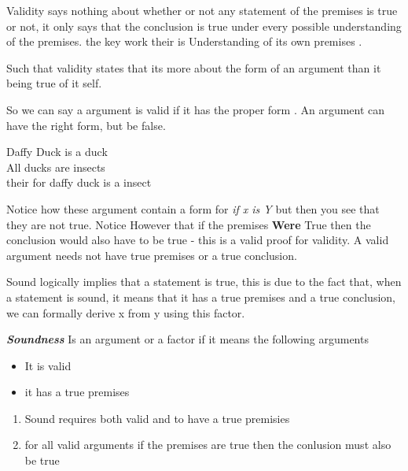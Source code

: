 \documentclass{article}
\theoremstyle{mytheoremstyle}
\theoremstyle{mytheoremstyle}
\theoremstyle{myproblemstyle}
\begin{document}
\begin{theorem}
    Validity says nothing about whether or not any statement of the premises is true or not, it only says that the conclusion is true under every possible understanding of the premises.
    the key work their is Understanding of its own premises .

    Such that validity states that its more about the form of an argument than it being true of it self.
\end{theorem}

So we can say a argument is valid if it has the proper form . An argument can have the right form, but be false.
\\
\begin{tt}
Daffy Duck is a duck \\
All ducks are insects \\
their for daffy duck is a insect \\
\end{tt}

Notice how these argument contain a form for \textit{if x is Y} but then you see that they are not true.
Notice However that if the premises \textbf{Were} True then the conclusion would also have to be true - this is a valid proof for validity. A valid argument needs not have true premises or a true conclusion.

\begin{theorem}
    Sound logically implies that a statement is true, this is due to the fact that, when a statement is sound, it means that it has a true premises and a true conclusion, we can formally derive x from y using this factor.

    \textbf{\textit{Soundness}} Is an argument or a factor if it means the following arguments

    \begin{itemize}
        \item It is valid
        \item it has a true premises
    \end{itemize}
\end{theorem}

\begin{enumerate}
  \item  Sound requires both valid and to have a true premisies
  \item for all valid arguments if the premises are true then the conlusion must also be true
\end{enumerate}
\end{document}
